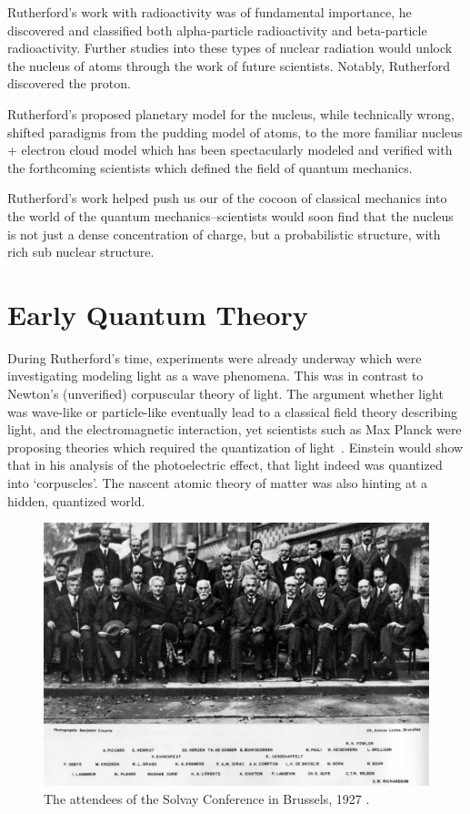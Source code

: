 Rutherford's work with radioactivity was of fundamental importance, he
discovered and classified both alpha-particle radioactivity and beta-particle
radioactivity. Further studies into these types of nuclear radiation would
unlock the nucleus of atoms through the work of future scientists. Notably,
Rutherford discovered the proton.

Rutherford's proposed planetary model for the nucleus, while technically wrong,
shifted paradigms from the pudding model of  atoms, to the more familiar nucleus
+ electron cloud model which has been spectacularly modeled and verified with
the forthcoming scientists which defined the field of quantum mechanics.

Rutherford's work helped push us our of the cocoon of classical mechanics into
the world of the quantum mechanics--scientists would soon find that the
nucleus is not just a dense concentration of charge, but a probabilistic
structure, with rich sub nuclear structure.

\clearpage
\section{Early Quantum Theory}

During Rutherford's time, experiments were already underway which were
investigating modeling light as a wave phenomena. This was in contrast to
Newton's (unverified) corpuscular theory of light. The argument whether light
was wave-like or particle-like eventually lead to a classical field theory
describing light, and the electromagnetic interaction, yet scientists such as
Max Planck were proposing theories which required the quantization of
light~\cite{Planck1901}. Einstein would show that in his analysis of the
photoelectric effect, that light indeed was quantized into `corpuscles'. The
nascent atomic theory of matter was also hinting at a hidden, quantized world.

\begin{figure}
	\centering
	\includegraphics[width=\linewidth]{./figures/solvay.jpg}
	\caption{
		The attendees of the Solvay Conference in Brussels, 1927
		 \cite{BenjaminCroupie1927}.
	}
	\label{fig:solvay}
\end{figure}

